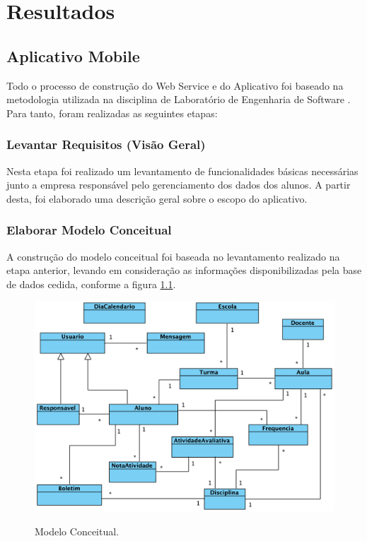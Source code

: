 \chapter{\textbf{Resultados}} %
\sloppy %

\section{Aplicativo Mobile}

Todo o processo de construção do Web Service e do Aplicativo foi baseado na metodologia utilizada na disciplina de Laboratório de Engenharia de Software \cite{rupLes}. Para tanto, foram realizadas as seguintes etapas:

\subsection{Levantar Requisitos (Visão Geral)}

Nesta etapa foi realizado um levantamento de funcionalidades básicas necessárias junto a empresa responsável pelo gerenciamento dos dados dos alunos. A partir desta, foi elaborado uma descrição geral sobre o escopo do aplicativo.

\subsection{Elaborar Modelo Conceitual}

A construção do modelo conceitual foi baseada no levantamento realizado na etapa anterior, levando em consideração as informações disponibilizadas pela base de dados cedida, conforme a figura \ref{figura:modelo_conceitual}.

\begin{figure}[H]
	\caption{Modelo Conceitual.}
	\centering %
	\includegraphics[width=15cm]{resources/modelo_conceitual.png} %
	\label{figura:modelo_conceitual}
	\footnotesize{}
\end{figure}

